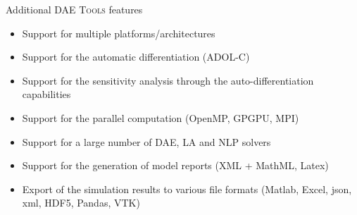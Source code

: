 \documentclass[compress,newPxFont,sthlmFooter]{beamer}
\begin{document}

\begin{frame}{Additional \textsc{DAE Tools} features}
    \begin{itemize}
        \item Support for \alert{multiple platforms/architectures} 
        \item Support for the \alert{automatic differentiation} (ADOL-C)
        \item Support for the \alert{sensitivity analysis} through the auto-differentiation capabilities
        \item Support for the \alert{parallel} computation (OpenMP, GPGPU, MPI)
        \item Support for a large number of \alert{DAE}, \alert{LA} and \alert{NLP} solvers 
        \item Support for the generation of \alert{model reports} (XML + MathML, Latex)
        \item \alert{Export} of the \alert{simulation results} to various file formats (Matlab, Excel, json, xml, HDF5, Pandas, VTK)
    \end{itemize}
\end{frame}
\end{document}
